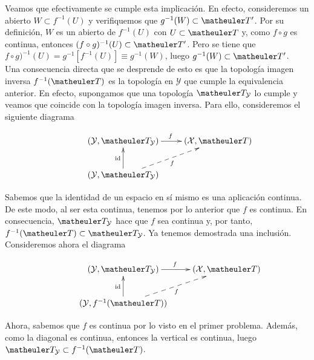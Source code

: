 Veamos que efectivamente se cumple esta implicación. En efecto, consideremos un abierto $W\subset f^{-1}(U)$ y verifiquemos que $g^{-1}(W)\subset \T'$. Por su definición, $W$ es un abierto de $f^{-1}(U)$ con $U\subset \T$ y, como $f\circ g$ es continua, entonces $(f\circ g)^{-1}(U)\subset \T'$. Pero se tiene que $f\circ g)^{-1}(U)=g^{-1}[f^{-1}(U)]\equiv g^{-1}(W)$, luego $g^{-1}(W)\subset \T'$. \\

Una consecuencia directa que se desprende de esto es que la topología imagen inversa $f^{-1}(\T)$ es la topología en $\mathcal{Y}$ que cumple la equivalencia anterior. En efecto, supongamos que una topología $\T_\mathcal{Y}$ lo cumple y veamos que coincide con la topología imagen inversa. Para ello, consideremos el siguiente diagrama

\begin{equation*}
\xymatrix{
&(\mathcal{Y},\T_{\mathcal{Y}}) \ar[r]^f
&(\mathcal{X},\T) \\
&(\mathcal{Y},\T_{\mathcal{Y}}) \ar@{-->}[ru]_f \ar[u]^{\text{id}}}
\end{equation*}

Sabemos que la identidad de un espacio en sí mismo es una aplicación continua. De este modo, al ser esta continua, tenemos por lo anterior que $f$ es continua. En consecuencia, $\T_{\mathcal{Y}}$ hace que $f$ sea continua y, por tanto, $f^{-1}(\T)\subset \T_{\mathcal{Y}}$. Ya tenemos demostrada una inclusión. \\

Consideremos ahora el diagrama 

\begin{equation*}
\xymatrix{
&(\mathcal{Y},\T_{\mathcal{Y}}) \ar[r]^f
&(\mathcal{X},\T) \\
&(\mathcal{Y},f^{-1}(\T)) \ar@{-->}[ru]_f \ar[u]^{\text{id}}}
\end{equation*}

Ahora, sabemos que $f$ es continua por lo visto en el primer problema. Además, como la diagonal es continua, entonces la vertical es continua, luego $\T_{\mathcal{Y}} \subset f^{-1}(\T)$. \\

